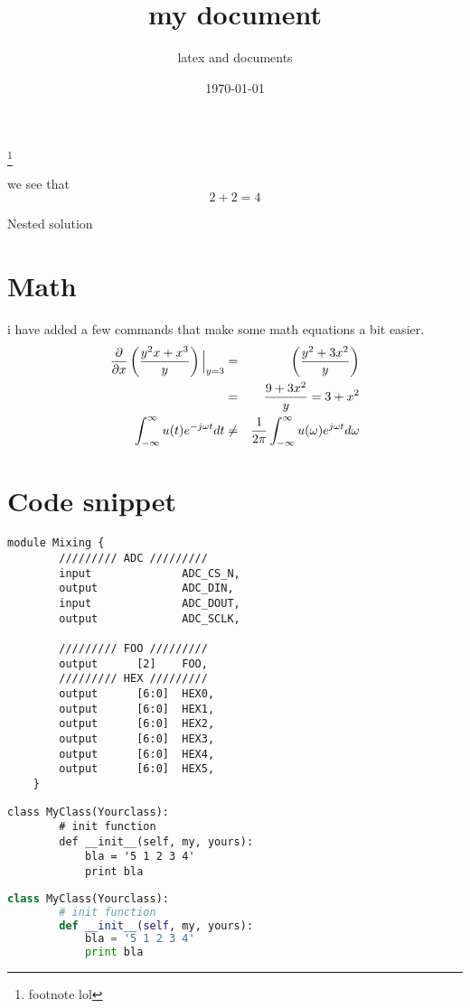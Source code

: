 \documentclass[12pt,en,bordered]{uni-style}
\title{my document}
\subtitle{latex and documents}
\date{\today}
\begin{document}
\maketitlepage
\maketitlestart
\blindtext[2]
\footnote{footnote lol}
\begin{qsolve}[My conclusion]
	we see that $$2+2=4$$
	\begin{qsolve}[]
		Nested solution
	\end{qsolve}
\end{qsolve}
\vfil
\begin{conclusion}
	\blindtext
\end{conclusion}
\clearpage
\section{Math}
i have added a few commands that make some math equations
a bit easier.
\begin{eqnarray*}
	\pderivv{\frac{y^2x+x^3}{y}}{x}\Big|_{y=3} &=& \left(\frac{y^2+3x^2}{y}\right)\\
	&=& \frac{9+3x^2}{y} = 3 + x^2\\
	\fourier{u(t)} &\neq& \ifourier{u(\omega)}
\end{eqnarray*}
\section{Code snippet}
    \begin{lstlisting}[style={verilog-style},caption={verilog code snippet}]
    module Mixing {
        ///////// ADC /////////
        input              ADC_CS_N,
        output             ADC_DIN,
        input              ADC_DOUT,
        output             ADC_SCLK,

        ///////// FOO /////////
        output      [2]    FOO,
        ///////// HEX /////////
        output      [6:0]  HEX0,
        output      [6:0]  HEX1,
        output      [6:0]  HEX2,
        output      [6:0]  HEX3,
        output      [6:0]  HEX4,
        output      [6:0]  HEX5,
    }
    \end{lstlisting}
    \begin{lstlisting}[style={python-style},caption={python style}]
    class MyClass(Yourclass):
        # init function
        def __init__(self, my, yours):
            bla = '5 1 2 3 4'
            print bla
    \end{lstlisting}
    \begin{lstlisting}[language=Python,caption={default Settings}]
    class MyClass(Yourclass):
        # init function
        def __init__(self, my, yours):
            bla = '5 1 2 3 4'
            print bla
    \end{lstlisting}
\clearpage
\blinddocument
\end{document}
